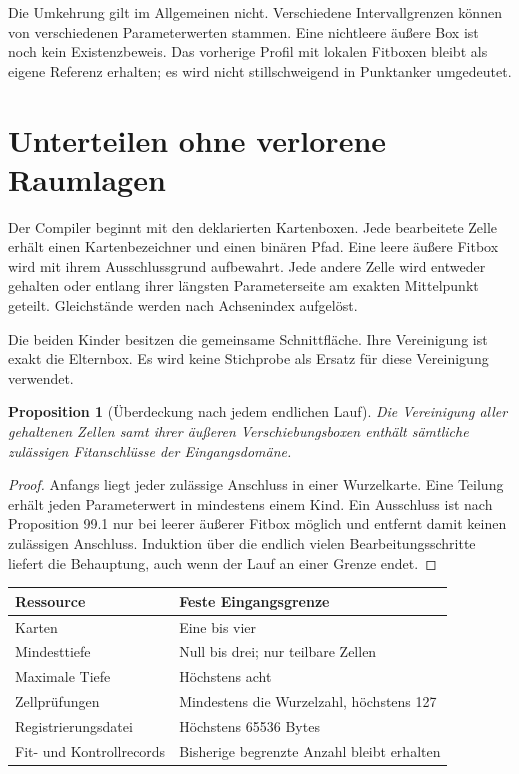 \documentclass[11pt,a4paper]{article}
\newcommand{\nextsection}[2]{\clearpage{\color{accent}\small\textsf{#1}}\section{#2}}
\newtheorem{proposition}{Proposition}[section]
\begin{document}
Die Umkehrung gilt im Allgemeinen nicht. Verschiedene
Intervallgrenzen können von verschiedenen Parameterwerten
stammen. Eine nichtleere äußere Box ist noch kein Existenzbeweis.
Das vorherige Profil mit lokalen Fitboxen bleibt als eigene
Referenz erhalten; es wird nicht stillschweigend in Punktanker umgedeutet.

\nextsection{100 / BEGRENZTE ÜBERDECKUNG}{Unterteilen ohne verlorene Raumlagen}
Der Compiler beginnt mit den deklarierten Kartenboxen. Jede
bearbeitete Zelle erhält einen Kartenbezeichner und einen binären
Pfad. Eine leere äußere Fitbox wird mit ihrem Ausschlussgrund
aufbewahrt. Jede andere Zelle wird entweder gehalten oder entlang
ihrer längsten Parameterseite am exakten Mittelpunkt geteilt.
Gleichstände werden nach Achsenindex aufgelöst.

Die beiden Kinder besitzen die gemeinsame Schnittfläche.
Ihre Vereinigung ist exakt die Elternbox. Es wird keine
Stichprobe als Ersatz für diese Vereinigung verwendet.
\begin{proposition}[Überdeckung nach jedem endlichen Lauf]
Die Vereinigung aller gehaltenen Zellen samt ihrer äußeren
Verschiebungsboxen enthält sämtliche zulässigen Fitanschlüsse
der Eingangsdomäne.
\end{proposition}
\begin{proof}
Anfangs liegt jeder zulässige Anschluss in einer Wurzelkarte.
Eine Teilung erhält jeden Parameterwert in mindestens einem Kind.
Ein Ausschluss ist nach Proposition 99.1 nur bei leerer äußerer
Fitbox möglich und entfernt damit keinen zulässigen Anschluss.
Induktion über die endlich vielen Bearbeitungsschritte liefert die
Behauptung, auch wenn der Lauf an einer Grenze endet.
\end{proof}

\begin{tabularx}{\linewidth}{@{}lY@{}}\toprule
Ressource & Feste Eingangsgrenze\\\midrule
Karten & Eine bis vier\\
Mindesttiefe & Null bis drei; nur teilbare Zellen\\
Maximale Tiefe & Höchstens acht\\
Zellprüfungen & Mindestens die Wurzelzahl, höchstens 127\\
Registrierungsdatei & Höchstens 65536 Bytes\\
Fit- und Kontrollrecords & Bisherige begrenzte Anzahl bleibt erhalten\\\bottomrule
\end{tabularx}
\end{document}
